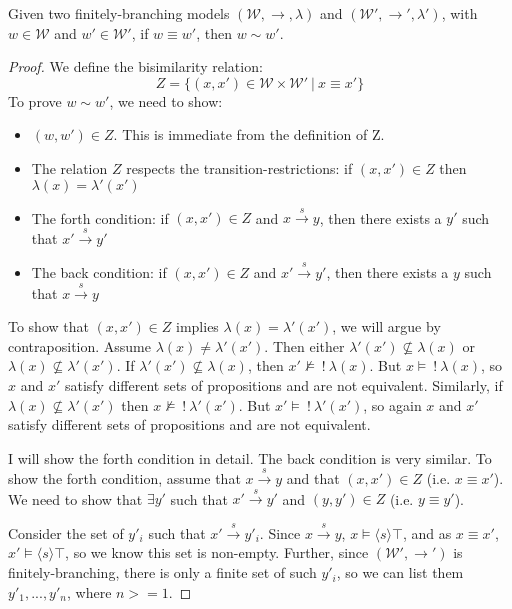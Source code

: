 \documentclass[smallextended]{svjour3}       %
\numberwithin{subcase}{mycase}
\def\fBang {\ ! \ }
\def\fOr {\ | \ }
\begin{document}
\begin{case}
Given two finitely-branching models $(\mathcal{W}, \rightarrow, \lambda)$ and $(\mathcal{W}', \rightarrow', \lambda')$, with $w \in \mathcal{W}$ and $w' \in \mathcal{W}'$,
if $w \equiv w'$, then $w \sim w'$.
\end{case}
\begin{proof}
We define the bisimilarity relation:
\[
Z = \{(x,x') \in \mathcal{W} \times \mathcal{W}' \fOr x \equiv x' \}
\]
To prove $w \sim w'$, we need to show:
\begin{itemize}
\item
$(w,w') \in Z$. This is immediate from the definition of Z.
\item
The relation $Z$ respects the transition-restrictions: if $(x,x') \in Z$ then $\lambda(x) = \lambda'(x')$
\item
The forth condition: if $(x,x') \in Z$ and $x \xrightarrow{s} y$, then there exists a $y'$ such that $x' \xrightarrow{s} y'$
\item
The back condition: if $(x,x') \in Z$ and $x' \xrightarrow{s} y'$, then there exists a $y$ such that $x \xrightarrow{s} y$
\end{itemize}
To show that $(x,x') \in Z$ implies $\lambda(x) = \lambda'(x')$, we will argue by contraposition.
Assume $\lambda(x) \neq \lambda'(x')$.
Then either $\lambda'(x') \nsubseteq  \lambda(x)$ or $\lambda(x) \nsubseteq  \lambda'(x')$.
If $\lambda'(x') \nsubseteq  \lambda(x)$, then $x' \nvDash \fBang \lambda(x)$.
But $x \models \fBang \lambda(x)$, so $x$ and $x'$ satisfy different sets of propositions and are not equivalent.
Similarly, if $\lambda(x) \nsubseteq  \lambda'(x')$ then $x \nvDash \fBang \lambda'(x')$.
But $x' \models \fBang \lambda'(x')$, so again $x$ and $x'$ satisfy different sets of propositions and are not equivalent.

I will show the forth condition in detail. The back condition is very similar.
To show the forth condition, assume that  $x \xrightarrow{s} y$ and that $(x,x') \in Z$ (i.e. $x \equiv x'$).
We need to show that $\exists y'$ such that $x' \xrightarrow{s} y'$ and $(y,y') \in Z$ (i.e. $y \equiv y'$).

Consider the set of $y'_i$ such that $x' \xrightarrow{s} y'_i$. Since $x \xrightarrow{s} y$, $x \models \langle s \rangle \top$, and as $x \equiv x'$,  $x' \models \langle s \rangle \top$, so we know this set is non-empty.
Further, since $(\mathcal{W}', \rightarrow')$ is finitely-branching, there is only a finite set of such $y'_i$, so we can list them $y'_1, ..., y'_n$,  where $n >= 1$.


\end{proof}
\end{document}
